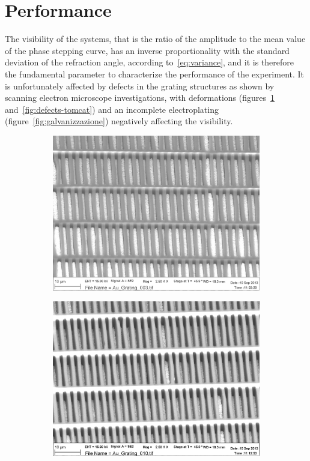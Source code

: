 \section{Performance}
The visibility of the systems, that is the ratio of the amplitude to the
mean value of the phase stepping curve, has an inverse proportionality with the
standard deviation of the refraction angle, according
to~\eqref{eq:variance}, and it is therefore the fundamental parameter to
characterize the performance of the experiment. It is unfortunately affected
by defects in the grating structures as shown by scanning electron
microscope investigations, with deformations (figures~\ref{fig:deformazioni}
and~\ref{fig:defects-tomcat})
and an incomplete electroplating (figure~\ref{fig:galvanizzazione})
negatively affecting the visibility.

\begin{figure}[htb]
    \centering
    \begin{subfigure}[b]{.49\textwidth}
    \centering
    \includegraphics[width=\textwidth]{gfx/Au_Grating_003.png}
    \caption{}
    \label{fig:deformazioni}
    \end{subfigure}
    \hfill
    \begin{subfigure}[b]{.49\textwidth}
    \centering
    \includegraphics[width=\textwidth]{gfx/Au_Grating_010.png}

\end{subfigure}
\end{figure}
